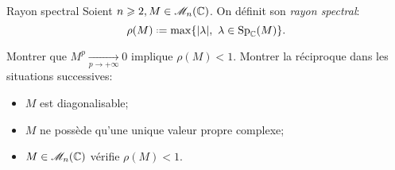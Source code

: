 \begin{defi}{Rayon spectral}
    Soient $n \geqslant 2, M \in \mathscr{M}_n(\mathbb{C})$. On définit son \emph{rayon spectral}:
    $$\rho(M) \defeq \max \{ |\lambda |,\ \lambda \in \Sp_{\C}(M) \}.$$
\end{defi}

\begin{exercice}
    Montrer que $M^p \xrightarrow[p \to +\infty]{} 0$ implique $\rho(M) < 1$. Montrer la réciproque dans les situations successives:
    \begin{itemize}
        \item $M$ est diagonalisable;
        \item $M$ ne possède qu'une unique valeur propre complexe;
        \item $M \in \mathscr{M}_n(\mathbb{C})$ vérifie $\rho(M) < 1$.
    \end{itemize}
\end{exercice}                                    

\begin{solution}
\end{solution}